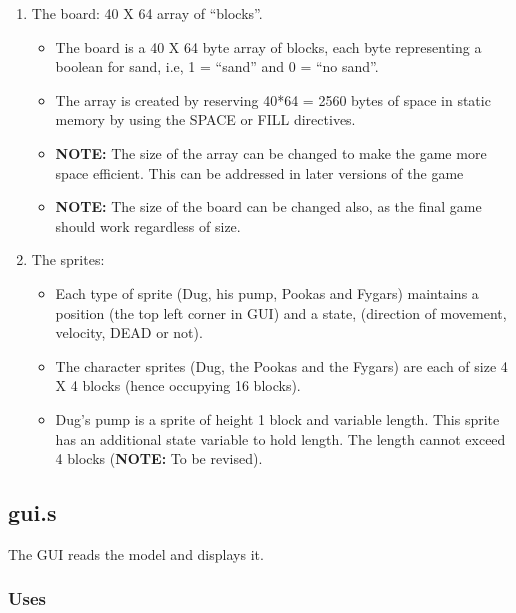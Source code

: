 \documentclass[]{article}
\begin{document}
\begin{enumerate}
\def\labelenumi{\arabic{enumi}.}
\itemsep1pt\parskip0pt
\item
  The board: 40 X 64 array of ``blocks''.

  \begin{itemize}
  \itemsep1pt\parskip0pt
  \item
    The board is a 40 X 64 byte array of blocks, each byte representing
    a boolean for sand, i.e, 1 = ``sand'' and 0 = ``no sand''.
  \item
    The array is created by reserving 40*64 = 2560 bytes of space in
    static memory by using the SPACE or FILL directives.
  \item
    \textbf{NOTE:} The size of the array can be changed to make the game
    more space efficient. This can be addressed in later versions of the
    game
  \item
    \textbf{NOTE:} The size of the board can be changed also, as the
    final game should work regardless of size.
  \end{itemize}
\item
  The sprites:

  \begin{itemize}
  \itemsep1pt\parskip0pt
  \item
    Each type of sprite (Dug, his pump, Pookas and Fygars) maintains a
    position (the top left corner in GUI) and a state, (direction of
    movement, velocity, DEAD or not).
  \item
    The character sprites (Dug, the Pookas and the Fygars) are each of
    size 4 X 4 blocks (hence occupying 16 blocks).
  \item
    Dug's pump is a sprite of height 1 block and variable length. This
    sprite has an additional state variable to hold length. The length
    cannot exceed 4 blocks (\textbf{NOTE:} To be revised).
  \end{itemize}
\end{enumerate}

\subsection{gui.s}\label{gui.s}

The GUI reads the model and displays it.

\subsubsection{Uses}\label{uses-1}
\end{document}
